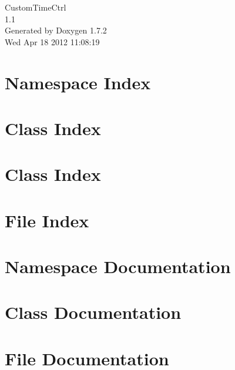 \documentclass[a4paper]{book}
\begin{document}
\hypersetup{pageanchor=false}
\begin{titlepage}
\vspace*{7cm}
\begin{center}
{\Large CustomTimeCtrl \\[1ex]\large 1.1 }\\
\vspace*{1cm}
{\large Generated by Doxygen 1.7.2}\\
\vspace*{0.5cm}
{\small Wed Apr 18 2012 11:08:19}\\
\end{center}
\end{titlepage}
\clearemptydoublepage
{}
\tableofcontents
\clearemptydoublepage
{}
\hypersetup{pageanchor=true}
\chapter{Namespace Index}

\chapter{Class Index}

\chapter{Class Index}

\chapter{File Index}

\chapter{Namespace Documentation}

\chapter{Class Documentation}




\chapter{File Documentation}










\printindex
\end{document}
